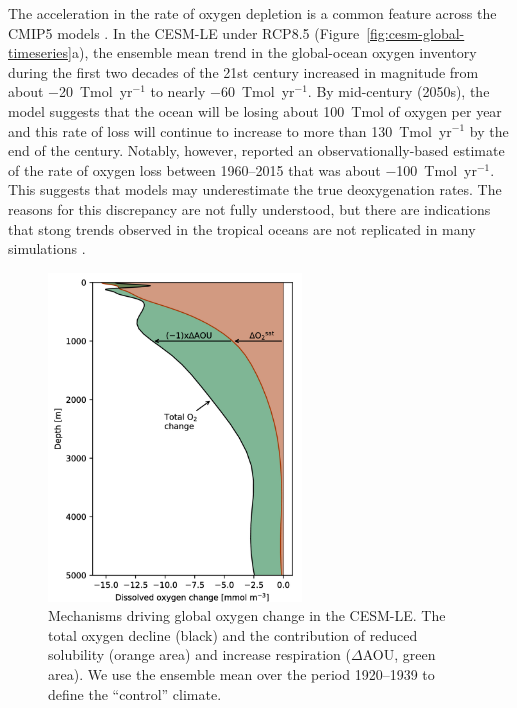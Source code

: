 \documentclass{report_chapter}
\begin{document}
The acceleration in the rate of oxygen depletion is a common feature across the CMIP5 models \citep{Bopp-Resplandy-etal-2013,Cocco-Joos-etal-2013}.
In the CESM-LE under RCP8.5 (Figure~\ref{fig:cesm-global-timeseries}a), the ensemble mean trend in the global-ocean oxygen inventory during the first two decades of the 21st century increased in magnitude from about $-$20~Tmol~yr$^{-1}$ to nearly $-$60~Tmol~yr$^{-1}$.
By mid-century (2050s), the model suggests that the ocean will be losing about 100~Tmol of oxygen per year and this rate of loss will continue to increase to more than 130~Tmol~yr$^{-1}$ by the end of the century.
Notably, however, \citet{Schmidtko-Stramma-etal-2017} reported an observationally-based estimate of the rate of oxygen loss between 1960--2015 that was about $-$100~Tmol~yr$^{-1}$.
This suggests that models may underestimate the true deoxygenation rates.
The reasons for this discrepancy are not fully understood, but there are indications that stong trends observed in the tropical oceans \citep{Stramma-Johnson-etal-2008,Stramma-Oschlies-etal-2012} are not replicated in many simulations \citep{Oschlies-Duteil-etal-2017}.


\begin{figure}[tbp]
\centering
\includegraphics[width=0.6\textwidth]{cesm-o2-change-profile.png}
\caption{Mechanisms driving global oxygen change in the CESM-LE.
The total oxygen decline (black) and the contribution of reduced solubility (orange area) and increase respiration ($\Delta$AOU, green area).
We use the ensemble mean over the period 1920--1939 to define the ``control'' climate.}
\label{fig:cesm-global-profile}
\end{figure}
\end{document}
